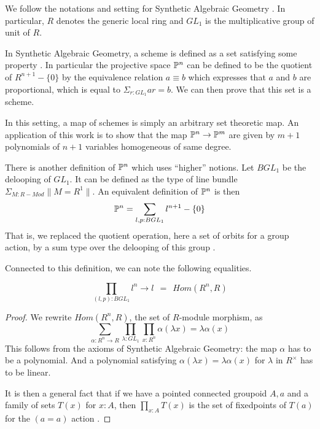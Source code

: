 We follow the notations and setting for Synthetic Algebraic Geometry \cite{draft}.
In particular, $R$ denotes the generic local ring and $GL_1$ is the multiplicative group of unit of $R$.

In Synthetic Algebraic Geometry, a scheme is defined as a set satisfying some property \cite{draft}. In particular
the projective space $\mathbb{P}^n$ can be defined to be the quotient of $R^{n+1}-\{0\}$ by the
equivalence relation $a\equiv b$ which expresses that $a$ and $b$ are proportional, %
which is equal to $\Sigma_{r:GL_1}ar = b$. We can then prove \cite{draft}
that this set is a scheme.

 In this setting, a map of schemes is simply an arbitrary set theoretic map. An application of this work is to show
 that the map $\mathbb{P}^n\rightarrow \mathbb{P}^m$ are given by $m+1$ polynomials of $n+1$ variables homogeneous of same degree.

\medskip


There is another definition of $\mathbb{P}^n$ which uses ``higher'' notions. Let $BGL_1$ be the delooping
of $GL_1$. It can be defined as the type of line bundle $\Sigma_{M:R-Mod}\|{M=R^1}\|$.
An equivalent definition of $\mathbb{P}^n$ is then \cite{Sym}
$$
\mathbb{P}^n = \sum_{l,p:BGL_1}l^{n+1}-\{0\}
$$
That is, we replaced the quotient operation, here a set of orbits for a group action, by a sum type over the delooping of this group
\cite{Sym}.

\medskip

Connected to this definition, we can note the following equalities.

\begin{proposition}\label{end}
  $$\prod_{(l,p):BGL_1}l^n\rightarrow l ~~=~~ Hom(R^n,R)$$
\end{proposition}

\begin{proof}
We rewrite $Hom(R^n,R)$, the set of $R$-module morphism, as
$$
\sum_{\alpha:R^n\rightarrow R}\prod_{\lambda:GL_1}\prod_{x:R^n}\alpha(\lambda x) = \lambda \alpha(x)
$$
This follows from the axioms of Synthetic Algebraic Geometry: the map $\alpha$ has to be a polynomial. And a polynomial
satisfying $\alpha(\lambda x) = \lambda \alpha(x)$ for $\lambda$ in $R^{\times}$ has to be linear.

\medskip

It is then a general fact that if we have a pointed connected groupoid $A,a$ and a family of
sets $T(x)$ for $x:A$, then $\prod_{x:A}T(x)$ is the set of fixedpoints of $T(a)$ for the $(a=a)$ action
\cite{Sym}.
\end{proof}

